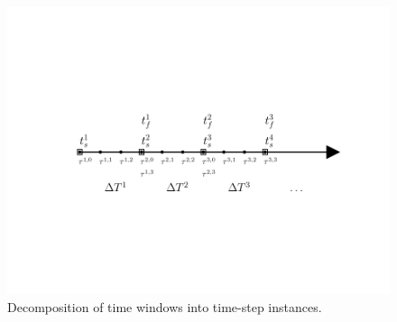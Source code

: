 \begin{figure} 
\begin{centering} 
\includegraphics[trim={0.0cm 5cm 0cm 3cm},clip,width=1.0\textwidth]{figs/time_grid_timesteps.pdf} 
\caption{Decomposition of time windows into time-step instances.} 
\label{fig:slab_fig2} 
\end{centering} 
\end{figure}

